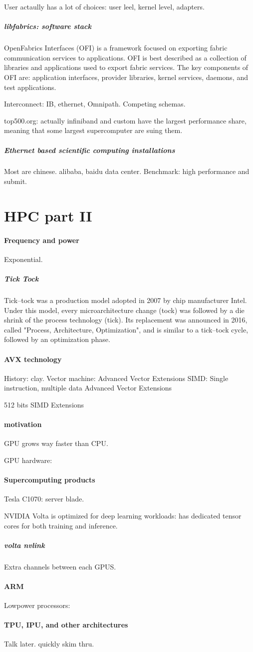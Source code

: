 \documentclass[12pt]{article}
\begin{document}
User actaully has a lot of choices: user leel, kernel level, adapters.

\subparagraph{libfabrics: software stack}
OpenFabrics Interfaces (OFI) is a framework focused on exporting fabric communication services to applications. OFI is best described as a collection of libraries and applications used to export fabric services. The key components of OFI are: application interfaces, provider libraries, kernel services, daemons, and test applications.

Interconnect: IB, ethernet, Omnipath. Competing schemas.

top500.org: actually infiniband and custom have the largest performance share, meaning that some largest supercomputer are suing them.

\subparagraph{Ethernet based scientific computing installations}
Most are chinese. alibaba, baidu data center. Benchmark: high performance and submit.

\section{HPC part II}
\paragraph{Frequency and power} Exponential.

\subparagraph{Tick Tock}
Tick–tock was a production model adopted in 2007 by chip manufacturer Intel. Under this model, every microarchitecture change (tock) was followed by a die shrink of the process technology (tick). Its replacement was announced in 2016, called "Process, Architecture, Optimization", and is similar to a tick–tock cycle, followed by an optimization phase.

\paragraph{AVX technology}
History: clay. Vector machine: Advanced Vector Extensions
SIMD: Single instruction, multiple data
Advanced Vector Extensions

512 bits SIMD Extensions


\paragraph{motivation}
GPU grows way faster than CPU.

GPU hardware:

\paragraph{Supercomputing products}
Tesla C1070: server blade.

NVIDIA Volta is optimized for deep learning workloads: 
has dedicated tensor cores for both training and inference.


\subparagraph{volta nvlink}
Extra channels between each GPUS.

\paragraph{ARM}
Lowpower processors: 

\paragraph{TPU, IPU, and other architectures}
Talk later. quickly skim thru.
\end{document}
